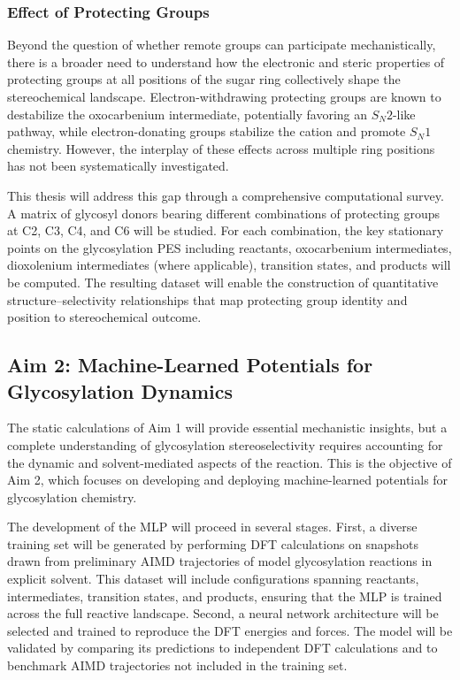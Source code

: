 \documentclass{article}
\begin{document}
\subsubsection{Effect of Protecting Groups}
Beyond the question of whether remote groups can participate mechanistically, there is a broader need to understand how the electronic and steric properties of protecting groups at all positions of the sugar ring collectively shape the stereochemical landscape. Electron-withdrawing protecting groups are known to destabilize the oxocarbenium intermediate, potentially favoring an $S_N2$-like pathway, while electron-donating groups stabilize the cation and promote $S_N1$ chemistry. However, the interplay of these effects across multiple ring positions has not been systematically investigated.

This thesis will address this gap through a comprehensive computational survey. A matrix of glycosyl donors bearing different combinations of protecting groups at C2, C3, C4, and C6 will be studied. For each combination, the key stationary points on the glycosylation PES including reactants, oxocarbenium intermediates, dioxolenium intermediates (where applicable), transition states, and products will be computed. The resulting dataset will enable the construction of quantitative structure--selectivity relationships that map protecting group identity and position to stereochemical outcome.

\subsection{Aim 2: Machine-Learned Potentials for Glycosylation Dynamics}

The static calculations of Aim 1 will provide essential mechanistic insights, but a complete understanding of glycosylation stereoselectivity requires accounting for the dynamic and solvent-mediated aspects of the reaction. This is the objective of Aim 2, which focuses on developing and deploying machine-learned potentials for glycosylation chemistry.

The development of the MLP will proceed in several stages. First, a diverse training set will be generated by performing DFT calculations on snapshots drawn from preliminary AIMD trajectories of model glycosylation reactions in explicit solvent. This dataset will include configurations spanning reactants, intermediates, transition states, and products, ensuring that the MLP is trained across the full reactive landscape. Second, a neural network architecture will be selected and trained to reproduce the DFT energies and forces. The model will be validated by comparing its predictions to independent DFT calculations and to benchmark AIMD trajectories not included in the training set.
\end{document}
